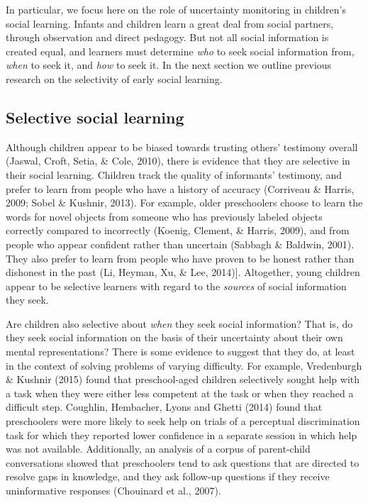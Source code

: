 \documentclass[english,man]{apa6}
\theoremstyle{definition}
\theoremstyle{definition}
\theoremstyle{definition}
\theoremstyle{remark}
\begin{document}
In particular, we focus here on the role of uncertainty monitoring in
children's social learning. Infants and children learn a great deal from
social partners, through observation and direct pedagogy. But not all
social information is created equal, and learners must determine
\emph{who} to seek social information from, \emph{when} to seek it, and
\emph{how} to seek it. In the next section we outline previous research
on the selectivity of early social learning.

\subsection{Selective social learning}\label{selective-social-learning}

Although children appear to be biased towards trusting others' testimony
overall (Jaswal, Croft, Setia, \& Cole, 2010), there is evidence that
they are selective in their social learning. Children track the quality
of informants' testimony, and prefer to learn from people who have a
history of accuracy (Corriveau \& Harris, 2009; Sobel \& Kushnir, 2013).
For example, older preschoolers choose to learn the words for novel
objects from someone who has previously labeled objects correctly
compared to incorrectly (Koenig, Clement, \& Harris, 2009), and from
people who appear confident rather than uncertain (Sabbagh \& Baldwin,
2001). They also prefer to learn from people who have proven to be
honest rather than dishonest in the past (Li, Heyman, Xu, \& Lee,
2014){]}. Altogether, young children appear to be selective learners
with regard to the \emph{sources} of social information they seek.

Are children also selective about \emph{when} they seek social
information? That is, do they seek social information on the basis of
their uncertainty about their own mental representations? There is some
evidence to suggest that they do, at least in the context of solving
problems of varying difficulty. For example, Vredenburgh \& Kushnir
(2015) found that preschool-aged children selectively sought help with a
task when they were either less competent at the task or when they
reached a difficult step. Coughlin, Hembacher, Lyons and Ghetti (2014)
found that preschoolers were more likely to seek help on trials of a
perceptual discrimination task for which they reported lower confidence
in a separate session in which help was not available. Additionally, an
analysis of a corpus of parent-child conversations showed that
preschoolers tend to ask questions that are directed to resolve gaps in
knowledge, and they ask follow-up questions if they receive
uninformative responses (Chouinard et al., 2007).
\end{document}
